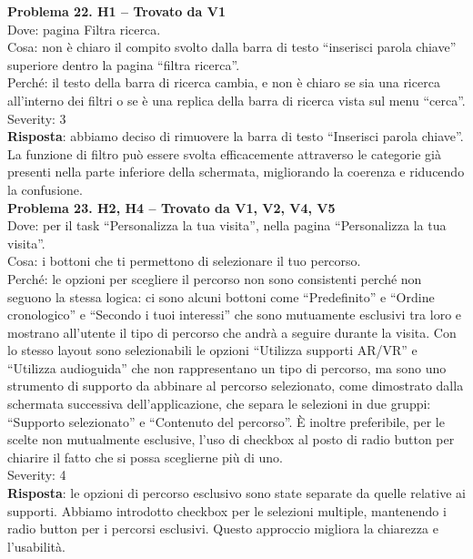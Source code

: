 \documentclass{article}
\begin{document}
\noindent \textbf{Problema 22. H1 – Trovato da V1} \\
Dove: pagina Filtra ricerca. \\
Cosa: non è chiaro il compito svolto dalla barra di testo “inserisci parola chiave” superiore dentro la pagina “filtra ricerca”. \\
Perché: il testo della barra di ricerca cambia, e non è chiaro se sia una ricerca all’interno dei filtri o se è una replica della barra di ricerca vista sul menu “cerca”. \\
Severity: 3 \\
\textbf{Risposta}: abbiamo deciso di rimuovere la barra di testo “Inserisci parola chiave”. La funzione di filtro può essere svolta efficacemente attraverso le categorie già presenti nella parte inferiore della schermata, migliorando la coerenza e riducendo la confusione.\\

\noindent \textbf{Problema 23. H2, H4 – Trovato da V1, V2, V4, V5} \\
Dove: per il task “Personalizza la tua visita”, nella pagina “Personalizza la tua visita”. \\
Cosa: i bottoni che ti permettono di selezionare il tuo percorso. \\
Perché: le opzioni per scegliere il percorso non sono consistenti perché non seguono la stessa logica: ci sono alcuni bottoni come “Predefinito” e “Ordine cronologico” e “Secondo i tuoi interessi” che sono mutuamente esclusivi tra loro e mostrano all’utente il tipo di percorso che andrà a seguire durante la visita. Con lo stesso layout sono selezionabili le opzioni “Utilizza supporti AR/VR” e “Utilizza audioguida” che non rappresentano un tipo di percorso, ma sono uno strumento di supporto da abbinare al percorso selezionato, come dimostrato dalla schermata successiva dell’applicazione, che separa le selezioni in due gruppi: “Supporto selezionato” e “Contenuto del percorso”. È inoltre preferibile, per le scelte non mutualmente esclusive, l’uso di checkbox al posto di radio button per chiarire il fatto che si possa sceglierne più di uno. \\
Severity: 4 \\
\textbf{Risposta}: le opzioni di percorso esclusivo sono state separate da quelle relative ai supporti. Abbiamo introdotto checkbox per le selezioni multiple, mantenendo i radio button per i percorsi esclusivi. Questo approccio migliora la chiarezza e l’usabilità.\\
\end{document}
